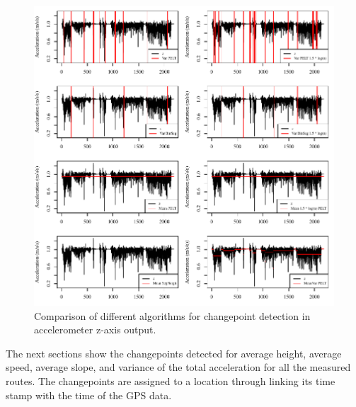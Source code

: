 
\begin{figure}[ht]
\includegraphics[width=\textwidth]{img/R_comparisonMethodsZ.pdf}
\centering
\caption{Comparison of different algorithms for changepoint detection in accelerometer z-axis output.\label{cpcomp}}
\end{figure} 

The next sections show the changepoints detected for average height, average speed, average slope, and variance of the total acceleration for all the measured routes. The changepoints are assigned to a location through linking its time stamp with the time of the GPS data. 


